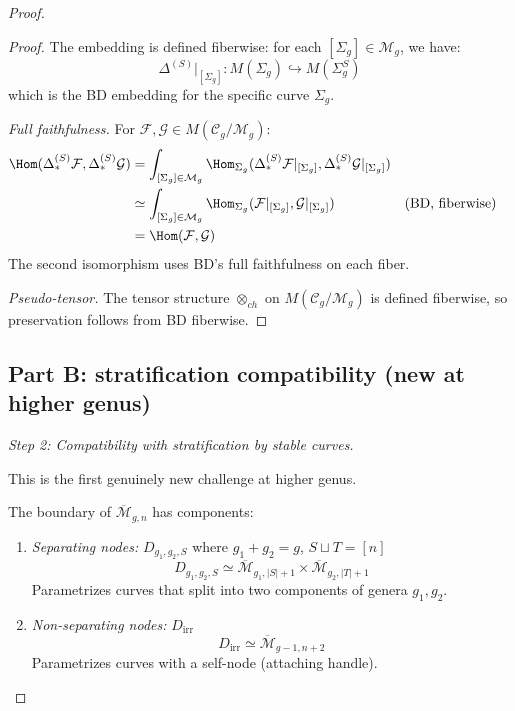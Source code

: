 \begin{proof}
\begin{proof}
The embedding is defined fiberwise: for each $[\Sigma_g] \in \mathcal{M}_g$, we have:
\[\Delta^{(S)}|_{[\Sigma_g]}: M(\Sigma_g) \hookrightarrow M(\Sigma_g^S)\]
which is the BD embedding for the specific curve $\Sigma_g$.

\emph{Full faithfulness.} For $\mathcal{F}, \mathcal{G} \in M(\mathcal{C}_g/\mathcal{M}_g)$:
\begin{align*}
\Hom(\Delta^{(S)}_* \mathcal{F}, \Delta^{(S)}_* \mathcal{G}) 
&= \int_{[\Sigma_g] \in \mathcal{M}_g} \Hom_{\Sigma_g}(\Delta^{(S)}_* \mathcal{F}|_{[\Sigma_g]}, \Delta^{(S)}_* \mathcal{G}|_{[\Sigma_g]}) \\
&\simeq \int_{[\Sigma_g] \in \mathcal{M}_g} \Hom_{\Sigma_g}(\mathcal{F}|_{[\Sigma_g]}, \mathcal{G}|_{[\Sigma_g]}) && \text{(BD, fiberwise)} \\
&= \Hom(\mathcal{F}, \mathcal{G})
\end{align*}
The second isomorphism uses BD's full faithfulness on each fiber.

\emph{Pseudo-tensor.} The tensor structure $\otimes_{ch}$ on $M(\mathcal{C}_g/\mathcal{M}_g)$ is defined fiberwise, so preservation follows from BD fiberwise. \qedhere
\end{proof}

\subsection*{Part B: stratification compatibility (new at higher genus)}

\emph{Step 2: Compatibility with stratification by stable curves.}

This is the first genuinely new challenge at higher genus.

\begin{definition}\label{def:boundary-strata}
The boundary of $\overline{\mathcal{M}}_{g,n}$ has components:
\begin{enumerate}
\item \emph{Separating nodes:} $D_{g_1,g_2,S}$ where $g_1 + g_2 = g$, $S \sqcup T = [n]$
\[D_{g_1,g_2,S} \simeq \overline{\mathcal{M}}_{g_1, |S|+1} \times \overline{\mathcal{M}}_{g_2, |T|+1}\]
Parametrizes curves that split into two components of genera $g_1, g_2$.

\item \emph{Non-separating nodes:} $D_{\text{irr}}$
\[D_{\text{irr}} \simeq \overline{\mathcal{M}}_{g-1, n+2}\]
Parametrizes curves with a self-node (attaching handle).
\end{enumerate}
\end{definition}


\end{proof}
